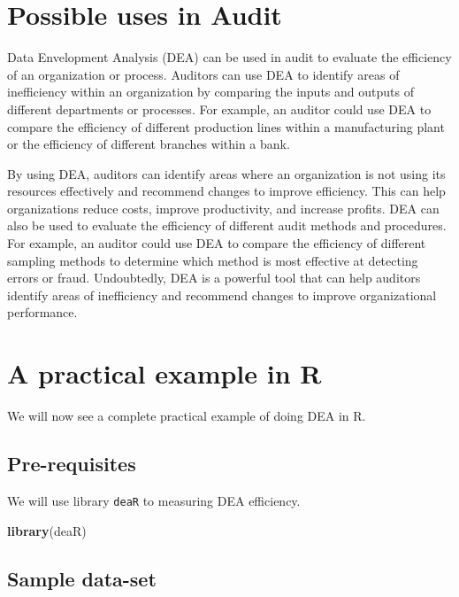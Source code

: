 \documentclass[
]{book}
\newenvironment{Shaded}{\begin{snugshade}}{\end{snugshade}}
\newcommand{\FunctionTok}[1]{\textcolor[rgb]{0.13,0.29,0.53}{\textbf{#1}}}
\newcommand{\NormalTok}[1]{#1}
\begin{document}
\hypertarget{possible-uses-in-audit}{%
\section{Possible uses in Audit}\label{possible-uses-in-audit}}

Data Envelopment Analysis (DEA) can be used in audit to evaluate the efficiency of an organization or process. Auditors can use DEA to identify areas of inefficiency within an organization by comparing the inputs and outputs of different departments or processes. For example, an auditor could use DEA to compare the efficiency of different production lines within a manufacturing plant or the efficiency of different branches within a bank.

By using DEA, auditors can identify areas where an organization is not using its resources effectively and recommend changes to improve efficiency. This can help organizations reduce costs, improve productivity, and increase profits. DEA can also be used to evaluate the efficiency of different audit methods and procedures. For example, an auditor could use DEA to compare the efficiency of different sampling methods to determine which method is most effective at detecting errors or fraud. Undoubtedly, DEA is a powerful tool that can help auditors identify areas of inefficiency and recommend changes to improve organizational performance.

\hypertarget{a-practical-example-in-r}{%
\section{A practical example in R}\label{a-practical-example-in-r}}

We will now see a complete practical example of doing DEA in R.

\hypertarget{pre-requisites-1}{%
\subsection{Pre-requisites}\label{pre-requisites-1}}

We will use library \texttt{deaR} to measuring DEA efficiency.

\begin{Shaded}
\begin{Highlighting}[]
\FunctionTok{library}\NormalTok{(deaR)}
\end{Highlighting}
\end{Shaded}

\hypertarget{sample-data-set}{%
\subsection{Sample data-set}\label{sample-data-set}}
\end{document}

